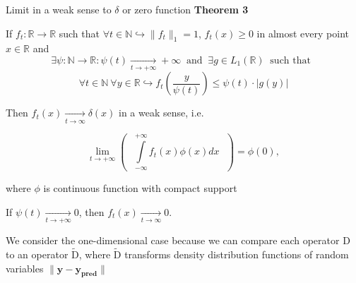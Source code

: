 \documentclass[aspectratio=169]{beamer}
\begin{document}
    \begin{frame}{Limit in a weak sense to $\delta$ or zero function}
        \normalsize{\textcolor{myNewColorA}{\textbf{Theorem 3}}}
        \small

        If $f_t : \mathbb{R} \to \mathbb{R}$ such that $\forall t \in \mathbb{N} \hookrightarrow  \|f_t\|_1 = 1$, $f_t(x) \geq 0$ in almost every point $x \in \mathbb{R}$ and
        \begin{equation*}
            \exists \psi : \mathbb{N} \to \mathbb{R} : \psi(t) \underset{t \to +\infty}{\longrightarrow} +\infty ~\text{ and }~
            \exists g \in L_1(\mathbb{R}) ~\text{ such that }~
        \end{equation*}
        \begin{equation}
            \label{g_and_psi}
            \forall t \in \mathbb{N} ~\forall y \in \mathbb{R} \hookrightarrow f_t\left(\dfrac{y}{\psi(t)}\right) \leq \psi(t) \cdot |g(y)|
        \end{equation}

        Then $f_t(x) \underset{t \to \infty}{\longrightarrow} \delta(x)$ in a weak sense, i.e.

        \begin{equation*}
            \underset{t \to +\infty}{\lim}\left( \text{ } \int\limits_{-\infty}^{+\infty} f_t(x) \phi(x) dx \text{ } \right) = \phi(0),
        \end{equation*}

        where $\phi$ is continuous function with compact support

        If $\psi(t) \underset{t \to +\infty}{\longrightarrow} 0$, then $f_t(x) \underset{t \to \infty}{\longrightarrow} 0$.

        We consider the one-dimensional case because we can compare each operator $\text{D}$ to an operator $\widetilde{\text{D}}$, where $\widetilde{\text{D}}$ transforms density distribution functions of random variables $\|\mathbf{y} - \mathbf{y_{\text{pred}}}\|$
        
    \end{frame}
\end{document}
